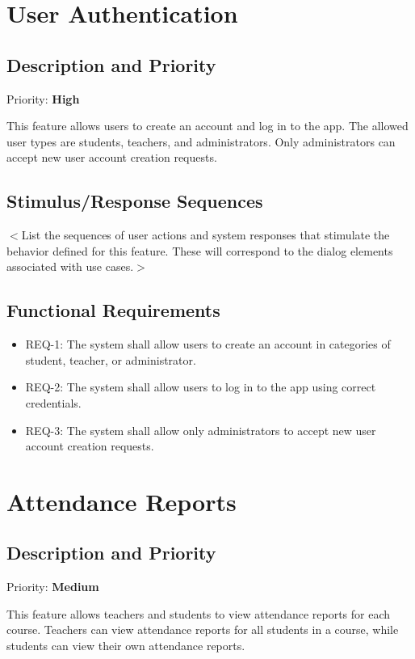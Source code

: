 \documentclass{scrreprt}
\begin{document}


\section{User Authentication}
\subsection{Description and Priority}
Priority: \textbf{High}

This feature allows users to create an account and log in to the app. The allowed user types are students, teachers, and administrators. 
Only administrators can accept new user account creation requests.
\subsection{Stimulus/Response Sequences}
$<$List the sequences of user actions and system responses that stimulate the 
behavior defined for this feature. These will correspond to the dialog elements 
associated with use cases.$>$

\subsection{Functional Requirements}
\begin{itemize}
    \item REQ-1: The system shall allow users to create an account in categories of student, teacher, or administrator.
    \item REQ-2: The system shall allow users to log in to the app using correct credentials.
    \item REQ-3: The system shall allow only administrators to accept new user account creation requests.
\end{itemize}


\section{Attendance Reports}
\subsection{Description and Priority}
Priority: \textbf{Medium}

This feature allows teachers and students to view attendance reports for each course. Teachers can view attendance reports for all students in a course, while students can view their own attendance reports.
\end{document}

